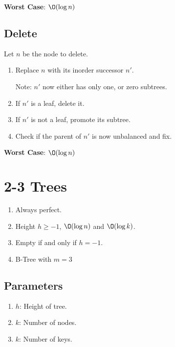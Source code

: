 \documentclass[12pt, letterpaper]{article}
\begin{document}
\begin{multicols*}{3}
        {\bf Worst Case}: $\O(\log n)$


        \subsection{Delete}
        Let $n$ be the node to delete.
        \begin{enumerate}
            \item Replace $n$ with its inorder successor $n'$.
            
            Note: $n'$ now either has only one, or zero subtrees.
            
            \item If $n'$ is a leaf, delete it.
            \item If $n'$ is not a leaf, promote its subtree.
            \item Check if the parent of $n'$ is now unbalanced and fix.
        \end{enumerate}
        
        {\bf Worst Case}: $\O(\log n)$




        
        \section{2-3 Trees}

        \begin{enumerate}
            \item Always perfect.
            \item Height $h \ge -1$, $\O(\log n)$ and $\O(\log k)$.
            \item Empty if and only if $h = -1$.
            \item B-Tree with $m = 3$
        \end{enumerate}

        \subsection{Parameters}
        \begin{enumerate}
            \item $h$: Height of tree.
            \item $k$: Number of nodes.
            \item $k$: Number of keys.
        \end{enumerate}




\end{multicols*}
\end{document}
